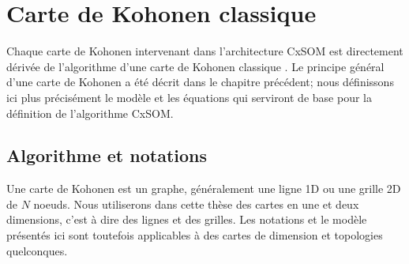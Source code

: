 \section{Carte de Kohonen classique}\label{sec:kohonen}
Chaque carte de Kohonen intervenant dans l'architecture CxSOM est directement dérivée de l'algorithme d'une carte de Kohonen classique \cite{Kohonen1982}. Le principe général d'une carte de Kohonen a été décrit dans le chapitre précédent; nous définissons ici plus précisément le modèle et les équations qui serviront de base pour la définition de l'algorithme CxSOM.

\subsection{Algorithme et notations}
Une carte de Kohonen est un graphe, généralement une ligne 1D ou une grille 2D de $N$ noeuds. Nous utiliserons dans cette thèse des cartes en une et deux dimensions, c'est à dire des lignes et des grilles. Les notations et le modèle présentés ici sont toutefois applicables à des cartes de dimension et topologies quelconques.


